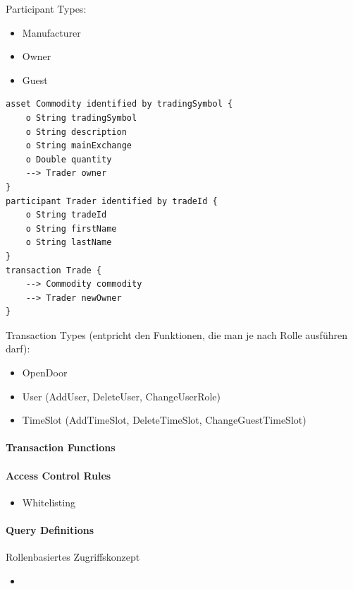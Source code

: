         Participant Types:
        \begin{itemize}[noitemsep]
            \item Manufacturer
            \item Owner
            \item Guest
        \end{itemize}
        \begin{lstlisting}[caption={Participant Types (TODO)},label=participants,captionpos=b]
asset Commodity identified by tradingSymbol {
    o String tradingSymbol
    o String description
    o String mainExchange
    o Double quantity
    --> Trader owner
}
participant Trader identified by tradeId {
    o String tradeId
    o String firstName
    o String lastName
}
transaction Trade {
    --> Commodity commodity
    --> Trader newOwner
}
        \end{lstlisting}
        
        
        Transaction Types (entpricht den Funktionen, die man je nach Rolle ausführen darf):
        \begin{itemize}[noitemsep]
            \item OpenDoor
            \item User (AddUser, DeleteUser, ChangeUserRole)
            \item TimeSlot (AddTimeSlot, DeleteTimeSlot, ChangeGuestTimeSlot)
        \end{itemize}
    
    \paragraph{Transaction Functions}
    
    \paragraph{Access Control Rules}
        \begin{itemize}
            \item Whitelisting
        \end{itemize}
    
    \paragraph{Query Definitions}
    
    Rollenbasiertes Zugriffskonzept
    \begin{itemize}[noitemsep]
        \item 
    \end{itemize}